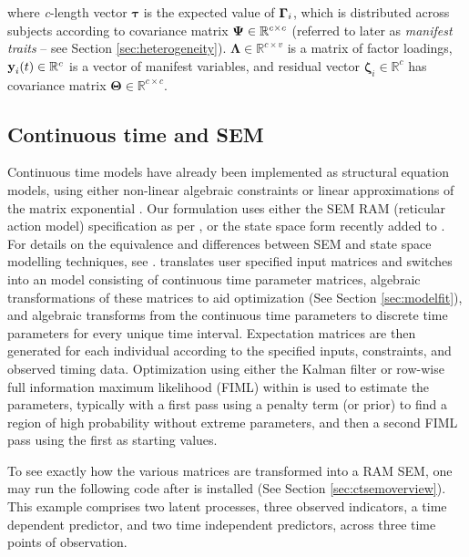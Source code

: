 \documentclass[nojss]{jss}\usepackage[]{graphicx}\usepackage[]{color}
\begin{document}
where \textit{c}-length vector $\boldsymbol{\tau}$ is the expected value of $\boldsymbol{\Gamma}_\mathnormal{i}$, which is distributed across subjects according to covariance matrix $\boldsymbol{\Psi} \in \mathbb{R}^{\mathnormal{c \times c}}$ (referred to later as \textit{manifest traits} -- see Section \ref{sec:heterogeneity}). $\boldsymbol{\Lambda} \in \mathbb{R}^{c \times v}$ is a matrix of factor loadings, $\textbf{y}_\mathnormal{i} (\mathnormal{t})\in\mathbb{R}^{c}$ is a vector of manifest variables, and residual vector $\boldsymbol{\zeta}_i \in \mathbb{R}^{c}$ has covariance matrix $\boldsymbol{\Theta} \in\mathbb{R}^{c \times c}$.

\subsection{Continuous time and SEM}\nopagebreak
Continuous time models have already been implemented as structural equation models, using either non-linear algebraic constraints \citep{oud2000continuous} or linear approximations of the matrix exponential \citep{oud2002continuous}. Our formulation uses either the SEM RAM (reticular action model) specification as per \citet{mcardle1984algebraic}, or the state space form recently added to  \citep{neale2015openmx, hunter2014state}. For details on the equivalence and differences between SEM and state space modelling techniques, see \citet{chow2010equivalence}.  translates user specified input matrices and switches into an  model consisting of continuous time parameter matrices, algebraic transformations of these matrices to aid optimization (See Section \ref{sec:modelfit}), and algebraic transforms from the continuous time parameters to discrete time parameters for every unique time interval. Expectation matrices are then generated for each individual according to the specified inputs, constraints, and observed timing data. Optimization using either the Kalman filter or row-wise full information maximum likelihood (FIML) within  is used to estimate the parameters, typically with a first pass using a penalty term (or prior) to find a region of high probability without extreme parameters, and then a second FIML pass using the first as starting values.

To see exactly how the various matrices are transformed into a RAM SEM, one may run the following code after  is installed (See Section \ref{sec:ctsemoverview}). This example comprises two latent processes, three observed indicators, a time dependent predictor, and two time independent predictors, across three time points of observation.
\end{document}

